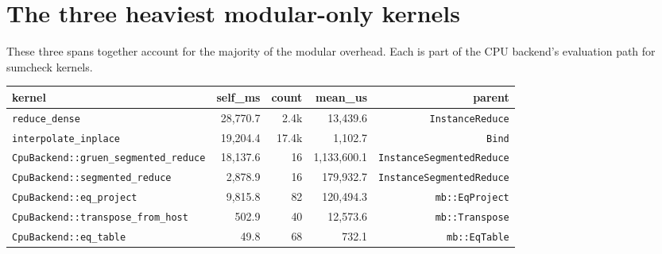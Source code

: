 \documentclass[10pt,a4paper]{article}
\begin{document}
\section{The three heaviest modular-only kernels}
These three spans together account for the majority of the modular overhead. Each is part of the CPU backend's evaluation path for sumcheck kernels.
\par\medskip\noindent\begin{tabular}{l r r r r}
\textbf{kernel} & \textbf{self\_ms} & \textbf{count} & \textbf{mean\_us} & \textbf{parent} \\ \midrule
\texttt{reduce\_dense} & 28,770.7 & 2.4k & 13,439.6 & \texttt{InstanceReduce} \\
\texttt{interpolate\_inplace} & 19,204.4 & 17.4k & 1,102.7 & \texttt{Bind} \\
\texttt{CpuBackend::gruen\_segmented\_reduce} & 18,137.6 & 16 & 1,133,600.1 & \texttt{InstanceSegmentedReduce} \\
\texttt{CpuBackend::segmented\_reduce} & 2,878.9 & 16 & 179,932.7 & \texttt{InstanceSegmentedReduce} \\
\texttt{CpuBackend::eq\_project} & 9,815.8 & 82 & 120,494.3 & \texttt{mb::EqProject} \\
\texttt{CpuBackend::transpose\_from\_host} & 502.9 & 40 & 12,573.6 & \texttt{mb::Transpose} \\
\texttt{CpuBackend::eq\_table} & 49.8 & 68 & 732.1 & \texttt{mb::EqTable} \\
\end{tabular}\par\medskip
\end{document}
